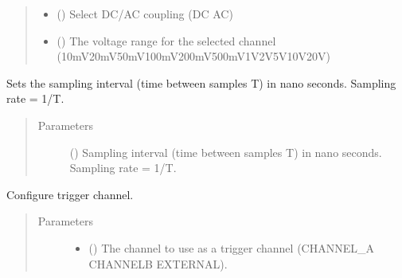 \documentclass[letterpaper,10pt,english]{sphinxmanual}
\begin{document}
\begin{fulllineitems}
\begin{fulllineitems}
\begin{quote}
\begin{description}
\begin{itemize}
\item {} 
 () \textendash{} Select DC/AC coupling (DC \textbar{} AC)

\item {} 
 () \textendash{} The voltage range for the selected channel (10mV\textbar{}20mV\textbar{}50mV\textbar{}100mV\textbar{}200mV\textbar{}500mV\textbar{}1V\textbar{}2V\textbar{}5V\textbar{}10V\textbar{}20V)

\end{itemize}

\end{description}\end{quote}

\end{fulllineitems}


\begin{fulllineitems}
\label{\detokenize{reference_doc:Picoscope.setSamplingInterval}}
Sets the sampling interval (time between samples T) in nano seconds. Sampling rate = 1/T.
\begin{quote}\begin{description}
\item[{Parameters}] \leavevmode
{} () \textendash{} Sampling interval (time between samples T) in nano seconds. Sampling rate = 1/T.

\end{description}\end{quote}

\end{fulllineitems}


\begin{fulllineitems}
\label{\detokenize{reference_doc:Picoscope.setTrigger}}
Configure trigger channel.
\begin{quote}\begin{description}
\item[{Parameters}] \leavevmode\begin{itemize}
\item {} 
 () \textendash{} The channel to use as a trigger channel (CHANNEL\_A \textbar{} CHANNELB \textbar{} EXTERNAL).


\end{itemize}
\end{description}
\end{quote}
\end{fulllineitems}
\end{fulllineitems}
\end{document}
